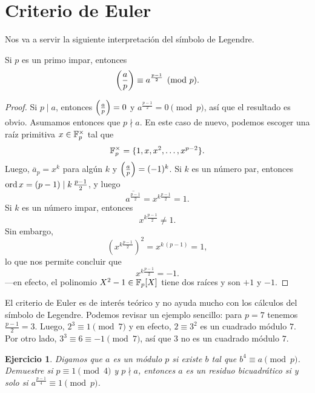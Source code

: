 \documentclass{article}
\theoremstyle{plain}
\newtheorem{ejerc}{Ejercicio}
\begin{document}

\section{Criterio de Euler}

Nos va a servir la siguiente interpretación del símbolo de Legendre.

\begin{proposicion}
  Si $p$ es un primo impar, entonces
  $$\left(\frac{a}{p}\right) \equiv a^{\frac{p-1}{2}} \pmod{p}.$$

  \begin{proof}
    Si $p \mid a$, entonces $\left(\frac{a}{p}\right) = 0$ y
    $a^{\frac{p-1}{2}} = 0 \pmod{p}$, así que el resultado es obvio. Asumamos
    entonces que $p\nmid a$. En este caso de nuevo, podemos escoger una raíz
    primitiva $x \in \mathbb{F}_p^\times$ tal que
    $$\mathbb{F}_p^\times = \{ 1, x, x^2, \ldots, x^{p-2} \}.$$
    Luego, $\overline{a}_p = x^k$ para algún $k$ y
    $\left(\frac{a}{p}\right) = (-1)^k$. Si $k$ es un número par, entonces
    $\operatorname{ord} x = (p-1) \mid k\,\frac{p-1}{2}$, y luego
    $$\overline{a^{\frac{p-1}{2}}} = x^{k\frac{p-1}{2}} = 1.$$
    Si $k$ es un número impar, entonces
    $$x^{k\frac{p-1}{2}} \ne 1.$$
    Sin embargo,
    $$\left(x^{k\frac{p-1}{2}}\right)^2 = x^{k\,(p-1)} = 1,$$
    lo que nos permite concluir que
    $$x^{k\frac{p-1}{2}} = -1.$$
    ---en efecto, el polinomio $X^2 - 1 \in \mathbb{F}_p [X]$ tiene dos raíces y son
    $+1$ y $-1$.
  \end{proof}
\end{proposicion}

\begin{ejemplo}
  El criterio de Euler es de interés teórico y no ayuda mucho con los cálculos
  del símbolo de Legendre. Podemos revisar un ejemplo sencillo: para $p = 7$
  tenemos $\frac{p-1}{2} = 3$. Luego, $2^3 \equiv 1 \pmod{7}$ y en efecto,
  $2 \equiv 3^2$ es un cuadrado módulo $7$. Por otro lado,
  $3^3 \equiv 6 \equiv -1 \pmod{7}$, así que $3$ no es un cuadrado módulo $7$.
\end{ejemplo}

\begin{ejerc}
  Digamos que $a$ es un  módulo $p$ si existe $b$ tal
  que $b^4 \equiv a \pmod{p}$. Demuestre si $p \equiv 1 \pmod{4}$ y $p\nmid a$,
  entonces $a$ es un residuo bicuadrático si y solo si
  $a^{\frac{p-1}{4}} \equiv 1 \pmod{p}$.
\end{ejerc}
\end{document}
